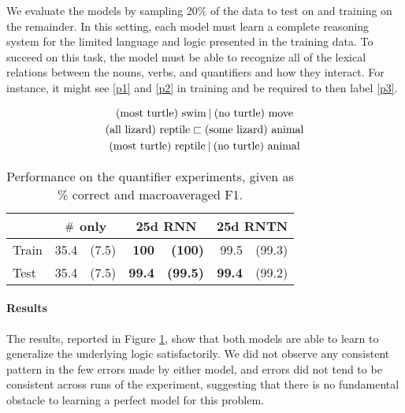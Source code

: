 
We evaluate the models by sampling 20\% of the data to test on and 
training on the remainder. In this setting, each model must learn a
complete reasoning system for the limited language and logic presented
in the training data. To succeed on this task, the model must be able
to recognize all of the lexical relations between the nouns, verbs,
and quantifiers and how they interact. For instance, it might see
\eqref{p1} and \eqref{p2} in training and be required to then label \eqref{p3}.

\vspace{-0.6cm}
\begin{gather}
  \text{(most turtle) swim} \mathbin{|} \text{(no turtle) move}\label{p1}
  \\
  \text{(all lizard) reptile} \sqsubset  \text{(some lizard) animal}\label{p2}
  \\
  \text{(most turtle) reptile} \mathbin{|} \text{(no turtle) animal}\label{p3}
\end{gather}\vspace{-0.8cm}

\begin{table}[tp]
  \centering \small
  \begin{tabular}{ l r@{ \ }r r@{ \ }r r@{ \ }r }
    \toprule
    ~&\multicolumn{2}{c}{$\mathbin{\#}$ only} & \multicolumn{2}{c}{25d RNN}  & \multicolumn{2}{c}{25d RNTN}\\
    \midrule
    Train & 35.4 &(7.5) &	\textbf{100}&		\textbf{(100)}&	99.5&	(99.3)\\	
    Test & 35.4 &(7.5) &	\textbf{99.4}&\textbf{(99.5)}& \textbf{99.4} & (99.2)\\
    \bottomrule
  \end{tabular}
  \caption{Performance on the quantifier experiments, given as \% correct and macroaveraged F1.}
  \label{qresultstable}
\end{table} 
%
%
\paragraph{Results} The results, reported in Figure \ref{qresultstable}, show that both models are able to learn to generalize the underlying logic satisfactorily. We did not observe any consistent pattern in the few errors made by either model, and errors did not tend to be consistent across runs of the experiment, suggesting that there is no fundamental obstacle to learning a perfect model for this problem.
